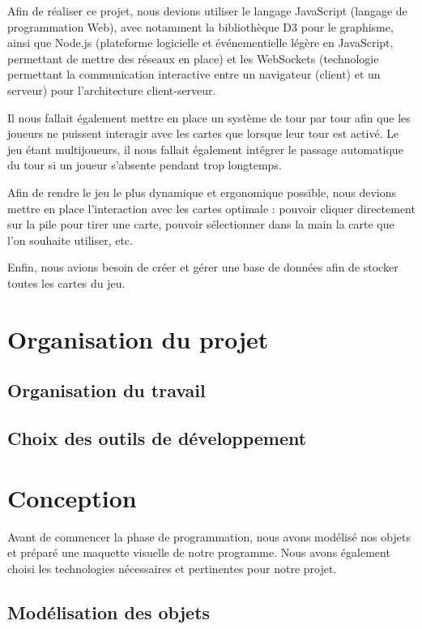 \documentclass[12pt]{report}
\begin{document}
    Afin de réaliser ce projet, nous devions utiliser le langage JavaScript (langage de programmation Web), avec notamment la bibliothèque D3 pour le graphisme, ainsi que Node.js (plateforme logicielle et événementielle légère en JavaScript, permettant de mettre des réseaux en place) et les WebSockets (technologie permettant la communication interactive entre un navigateur (client) et un serveur) pour l'architecture client-serveur. 
    
    
    Il nous fallait également mettre en place un système de tour par tour afin que les joueurs ne puissent interagir avec les cartes que lorsque leur tour est activé. Le jeu étant multijoueurs, il nous fallait également intégrer le passage automatique du tour si un joueur s'absente pendant trop longtemps. 
    
    
    Afin de rendre le jeu le plus dynamique et ergonomique possible, nous devions mettre en place l'interaction avec les cartes optimale : pouvoir cliquer directement sur la pile pour tirer une carte, pouvoir sélectionner dans la main la carte que l'on souhaite utiliser, etc. 
    
    Enfin, nous avions besoin de créer et gérer une base de données afin de stocker toutes les cartes du jeu.
    
\chapter{Organisation du projet}

    \section{Organisation du travail}
    
    \section{Choix des outils de développement}
    
\chapter{Conception}

	Avant de commencer la phase de programmation, nous avons modélisé nos objets et préparé une maquette visuelle de notre programme. Nous avons également choisi les technologies nécessaires et pertinentes pour notre projet. 
    
    \section{Modélisation des objets}
    
\end{document}
